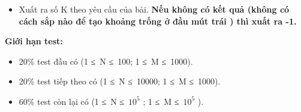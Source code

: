 \begin{itemize}
	\item     Xuất ra số K theo yêu cầu của bài.    \textbf{     Nếu không có kết quả (không có cách sắp nào để tạo khoảng trống ở đầu mút trái ) thì xuất ra -1.    }
\end{itemize}

\textbf{     Giới hạn test:    }
\begin{itemize}
	\item      20\% test đầu có (1 ≤ N ≤ 100; 1 ≤ M ≤ 1000).    
	\item      20\% test tiếp theo có           (1 ≤ N ≤ 10000; 1 ≤ M ≤ 1000).     
	\item        60\% test còn lại có (1 ≤ N ≤ $10^{5}$       ; 1 ≤ M ≤ $10^{5}$       ).      
\end{itemize}
\begin{itemize}
\end{itemize}